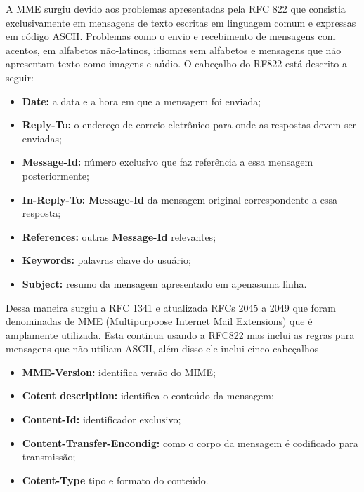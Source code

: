 A MME surgiu devido  aos problemas apresentadas pela RFC 822 que consistia exclusivamente em mensagens de texto escritas em linguagem comum e expressas em código ASCII. Problemas como o envio e recebimento de mensagens com acentos, em alfabetos não-latinos, idiomas sem alfabetos e mensagens que não apresentam texto como imagens e aúdio. O cabeçalho do RF822 está descrito a seguir:

\begin{itemize}
\item \textbf{Date:} a data e a hora em que a mensagem foi enviada;
\item \textbf{Reply-To:} o endereço de correio eletrônico para onde as respostas devem ser enviadas;
\item \textbf{Message-Id:} número exclusivo que faz referência a essa mensagem posteriormente;
\item \textbf{In-Reply-To:} \textbf{Message-Id} da mensagem original correspondente a essa resposta;
\item \textbf{References: } outras \textbf{Message-Id} relevantes;
\item \textbf{Keywords: } palavras chave do usuário;
\item \textbf{Subject: } resumo da mensagem apresentado em apenasuma linha.
\end{itemize}

Dessa maneira surgiu a RFC 1341 e atualizada RFCs 2045 a 2049 que foram denominadas de MME (Multipurpoose Internet Mail Extensions) que é amplamente utilizada. Esta continua usando a RFC822 mas inclui as regras para mensagens que não utiliam ASCII, além disso ele inclui cinco cabeçalhos

\begin{itemize}
\item \textbf{MME-Version:} identifica  versão do MIME;
\item \textbf{Cotent description:} identifica o conteúdo da mensagem;
\item \textbf{Content-Id:} identificador exclusivo;
\item \textbf{Content-Transfer-Encondig:} como o corpo da mensagem é codificado para transmissão;
\item \textbf{Cotent-Type} tipo e formato do conteúdo.
\end{itemize}
